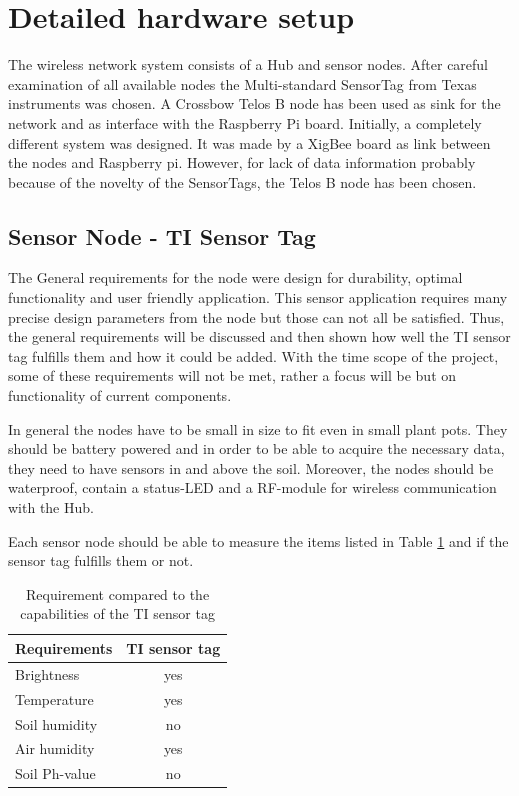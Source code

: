 \section{Detailed hardware setup}

The wireless network system consists of a Hub and sensor nodes. After careful examination of all available nodes the Multi-standard SensorTag from Texas instruments \cite{TIsensortag} was chosen. A Crossbow Telos B node has been used as sink for the network and as interface with the Raspberry Pi board. 
Initially, a completely different system was designed. It was made by a XigBee board as link between the nodes and Raspberry pi. However, for lack of data information probably because of the novelty of the SensorTags, the Telos B node has been chosen.


\subsection{Sensor Node - TI Sensor Tag}

The General requirements for the node were design for durability, optimal functionality and user friendly application. This sensor application requires many precise design parameters from the node but those can not all be satisfied. Thus, the general requirements will be discussed and then shown how well the TI sensor tag fulfills them and how it could be added. With the time scope of the project, some of these requirements will not be met, rather a focus will be but on functionality of current components.

In general the nodes have to be small in size to fit even in small plant pots. They should be battery powered and in order to be able to acquire the necessary data, they need to have sensors in and above the soil. Moreover, the nodes should be waterproof, contain a status-LED and a RF-module for wireless communication with the Hub.

Each sensor node should be able to measure the items listed in Table \ref{list-req} and if the sensor tag fulfills them or not.
\begin{table}[htbp]
	\centering
	\begin{tabular}{lc}
		\toprule
		Requirements & \multicolumn{1}{l}{TI sensor tag} \\ 
		\midrule
		Brightness & yes \\ 
		Temperature & yes \\ 
		Soil humidity & no \\ 
		Air humidity & yes \\ 
		Soil Ph-value & no \\
		\bottomrule 
	\end{tabular}
	\vspace{0.1cm}
	\caption{Requirement compared to the capabilities of the TI sensor tag}
	\label{list-req}
\end{table}


